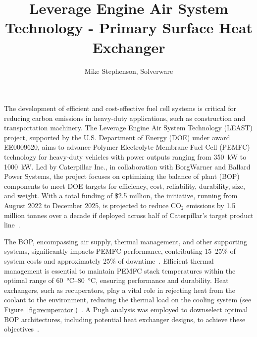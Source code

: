 \documentclass[12pt]{article}
\title{Leverage Engine Air System Technology - Primary Surface Heat Exchanger }
\author{Mike Stephenson, Solverware}
\begin{document}
\maketitle




\printglossary[type=symbols, title={Nomenclature}]

The development of efficient and cost-effective fuel cell systems is critical for reducing carbon emissions in heavy-duty applications, such as construction and transportation machinery. The Leverage Engine Air System Technology (LEAST) project, supported by the U.S. Department of Energy (DOE) under award EE0009620, aims to advance Polymer Electrolyte Membrane Fuel Cell (PEMFC) technology for heavy-duty vehicles with power outputs ranging from \SI{350}{\kilo\watt} to \SI{1000}{\kilo\watt}. Led by Caterpillar Inc., in collaboration with BorgWarner and Ballard Power Systems, the project focuses on optimizing the balance of plant (BOP) components to meet DOE targets for efficiency, cost, reliability, durability, size, and weight. With a total funding of \$2.5 million, the initiative, running from August 2022 to December 2025, is projected to reduce CO$_2$ emissions by 1.5 million tonnes over a decade if deployed across half of Caterpillar's target product line~\parencite{wang2024}.


The BOP, encompassing air supply, thermal management, and other supporting systems, significantly impacts PEMFC performance, contributing 15--25\% of system costs and approximately 25\% of downtime~\parencite{wang2024}. Efficient thermal management is essential to maintain PEMFC stack temperatures within the optimal range of \SIrange{60}{80}{\degreeCelsius}, ensuring performance and durability. Heat exchangers, such as recuperators, play a vital role in rejecting heat from the coolant to the environment, reducing the thermal load on the cooling system (see Figure~\ref{fig:recuperator})~\cite{wang2024}. A Pugh analysis was employed to downselect optimal BOP architectures, including potential heat exchanger designs, to achieve these objectives~\cite{wang2024}.
\end{document}
